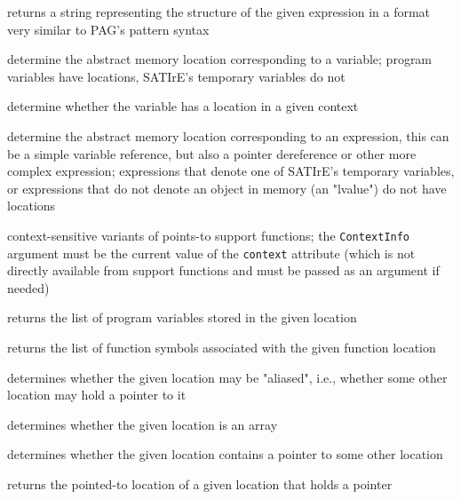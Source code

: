 \documentclass[a4paper,12pt]{report}
\begin{document}
\begin{description}
    returns a string representing the structure of the given expression in a
    format very similar to PAG's pattern syntax

    determine the abstract memory location corresponding to a variable;
    program variables have locations, SATIrE's temporary variables do not

    determine whether the variable has a location in a given context

    determine the abstract memory location corresponding to an expression,
    this can be a simple variable reference, but also a pointer dereference
    or other more complex expression; expressions that denote one of
    SATIrE's temporary variables, or expressions that do not denote an
    object in memory (an "lvalue") do not have locations

    context-sensitive variants of points-to support functions; the
    \texttt{ContextInfo} argument must be the current value of the
    \texttt{context} attribute (which is not directly available from support
    functions and must be passed as an argument if needed)

    returns the list of program variables stored in the given location

    returns the list of function symbols associated with the given function
    location

    determines whether the given location may be "aliased", i.e., whether
    some other location may hold a pointer to it

    determines whether the given location is an array

    determines whether the given location contains a pointer to some other
    location

    returns the pointed-to location of a given location that holds a pointer
\end{description}
\end{document}
